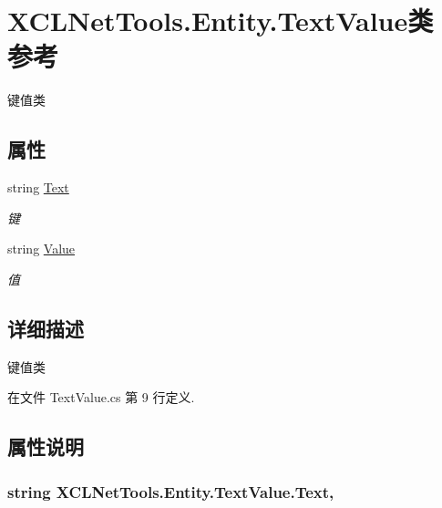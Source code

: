 \hypertarget{class_x_c_l_net_tools_1_1_entity_1_1_text_value}{\section{X\-C\-L\-Net\-Tools.\-Entity.\-Text\-Value类 参考}
\label{class_x_c_l_net_tools_1_1_entity_1_1_text_value}
}


键值类  


\subsection*{属性}
\begin{DoxyCompactItemize}
\item 
string \hyperlink{class_x_c_l_net_tools_1_1_entity_1_1_text_value_a56860ac04aa98fbb3e41e5b451d16c4a}{Text}
\begin{DoxyCompactList}\small\item\em 键 \end{DoxyCompactList}\item 
string \hyperlink{class_x_c_l_net_tools_1_1_entity_1_1_text_value_a8a193486b942adc898433bd29db3eff7}{Value}
\begin{DoxyCompactList}\small\item\em 值 \end{DoxyCompactList}\end{DoxyCompactItemize}


\subsection{详细描述}
键值类 



在文件 Text\-Value.\-cs 第 9 行定义.



\subsection{属性说明}
\hypertarget{class_x_c_l_net_tools_1_1_entity_1_1_text_value_a56860ac04aa98fbb3e41e5b451d16c4a}{
\subsubsection[{Text}]{\setlength{\rightskip}{0pt plus 5cm}string X\-C\-L\-Net\-Tools.\-Entity.\-Text\-Value.\-Text\hspace{0.3cm}{\ttfamily [get]}, {\ttfamily [set]}}}\label{class_x_c_l_net_tools_1_1_entity_1_1_text_value_a56860ac04aa98fbb3e41e5b451d16c4a}


